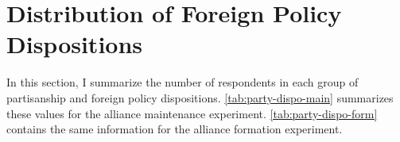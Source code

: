 \documentclass[12pt]{article}
\begin{document}
%
%
%
%
%
%
%
%
%
%


\section{Distribution of Foreign Policy Dispositions}

In this section, I summarize the number of respondents in each group of partisanship and foreign policy dispositions. 
\autoref{tab:party-dispo-main} summarizes these values for the alliance maintenance experiment. 
\autoref{tab:party-dispo-form} contains the same information for the alliance formation experiment. 
\end{document}
